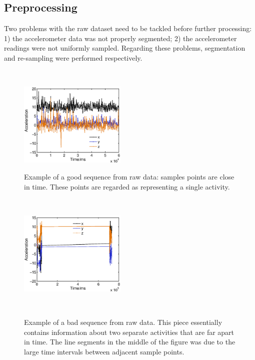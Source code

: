 \documentclass{article} %
\begin{document}
\subsection{Preprocessing}
Two problems with the raw dataset need to be tackled before further processing: 1) the accelerometer data was not properly segmented; 2) the accelerometer readings were not uniformly sampled. Regarding these problems, segmentation and re-sampling were performed respectively.

\begin{figure}
    \hspace{-0.5cm}
    \begin{minipage}[t]{0.02\textwidth}~
    \end{minipage}
    \begin{minipage}[t]{0.47\textwidth}
    \centering
    \includegraphics[height=40mm]{fig/good_raw.eps}
    \caption{Example of a good sequence from raw data: samples points are close in time. These points are regarded as representing a single activity.}
    \label{fig:good_raw}
    \end{minipage}
    \begin{minipage}[t]{0.02\textwidth}~
    \end{minipage}
    \begin{minipage}[t]{0.47\textwidth}
    \centering
    \includegraphics[height=40mm]{fig/bad_raw.eps}\\
    \caption{Example of a bad sequence from raw data. This piece essentially contains information about two separate activities that are far apart in time. The line segments in the middle of the figure was due to the large time intervals between adjacent sample points.}
    \label{fig:bad_raw}
    \end{minipage}
    \begin{minipage}[t]{0.02\textwidth}~
    \end{minipage}%
 \end{figure}
\end{document}
